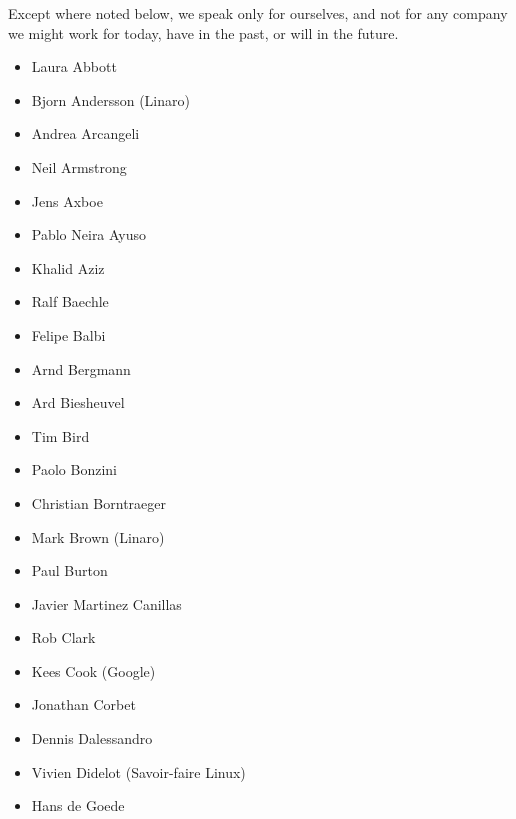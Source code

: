 \documentclass[a4paper,8pt,english]{sphinxmanual}
\begin{document}
Except where noted below, we speak only for ourselves, and not for any company
we might work for today, have in the past, or will in the future.
\begin{itemize}
\item {} 
Laura Abbott

\item {} 
Bjorn Andersson (Linaro)

\item {} 
Andrea Arcangeli

\item {} 
Neil Armstrong

\item {} 
Jens Axboe

\item {} 
Pablo Neira Ayuso

\item {} 
Khalid Aziz

\item {} 
Ralf Baechle

\item {} 
Felipe Balbi

\item {} 
Arnd Bergmann

\item {} 
Ard Biesheuvel

\item {} 
Tim Bird

\item {} 
Paolo Bonzini

\item {} 
Christian Borntraeger

\item {} 
Mark Brown (Linaro)

\item {} 
Paul Burton

\item {} 
Javier Martinez Canillas

\item {} 
Rob Clark

\item {} 
Kees Cook (Google)

\item {} 
Jonathan Corbet

\item {} 
Dennis Dalessandro

\item {} 
Vivien Didelot (Savoir-faire Linux)

\item {} 
Hans de Goede


\end{itemize}
\end{document}
